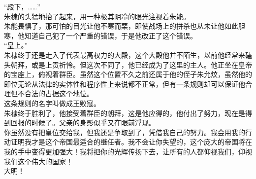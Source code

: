 \begin{multicols}{\theparacolNo}
“殿下，……”\\

朱棣的头猛地抬了起来，用一种极其阴冷的眼光注视着朱能。\\

朱能畏惧了，那可怕的目光让他不寒而栗，即使战场上的拼杀也从未让他如此胆寒，他知道自己犯了一个严重的错误，于是他改正了这个错误。\\

“皇上。”\\

朱棣终于还是走入了代表最高权力的大殿，这个大殿他并不陌生，以前他经常来磕头朝拜，或是上贡祈怜。但这次不同了，他已经成为了这里的主人。他正坐在皇帝的宝座上，俯视着群臣。虽然这个位置不久之前还属于他的侄子朱允炆，虽然他的即位无论从法律的实体性和程序性上来说都不正常，但有一条规则却可以保证他合理但不合法的占据这个地位。\\

这条规则的名字叫做成王败寇。\\

朱棣终于胜利了，他接受着群臣的朝拜，这是他应得的，他付出了努力，现在是得到回报的时候了。父亲的身影似乎又在眼前浮现。\\

你虽然没有把皇位交给我，但我还是争取到了，凭借我自己的努力。我会用我的行动证明我才是这个帝国最适合的继任者。我不会让你失望的，这个庞大的帝国将在我的手中变得更加强大！我将把你的光辉传扬下去，让所有的人都仰视我们，仰视我们这个伟大的国家！\\

大明！\\
\ifnum{}
	\end{multicols}
\fi
